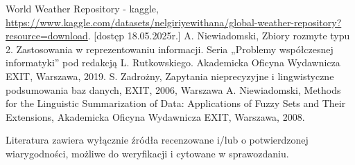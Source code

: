 \documentclass{article}
\begin{document}
\begin{thebibliography}{99}
 World Weather Repository - kaggle, \url{https://www.kaggle.com/datasets/nelgiriyewithana/global-weather-repository?resource=download}. [dostęp 18.05.2025r.]
  A. Niewiadomski, Zbiory rozmyte typu 2. Zastosowania w reprezentowaniu informacji.  Seria „Problemy współczesnej informatyki” pod redakcją L. Rutkowskiego. Akademicka Oficyna Wydawnicza EXIT, Warszawa, 2019.
 S. Zadrożny, Zapytania nieprecyzyjne i lingwistyczne podsumowania baz danych, EXIT, 2006, Warszawa
 A. Niewiadomski, Methods for the Linguistic Summarization of Data: Applications of Fuzzy Sets and Their Extensions, Akademicka Oficyna Wydawnicza EXIT, Warszawa, 2008.
\end{thebibliography}

Literatura zawiera wyłącznie źródła recenzowane i/lub o potwierdzonej wiarygodności,
możliwe do weryfikacji i cytowane w sprawozdaniu. 
\end{document}
